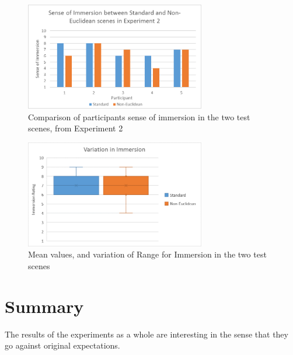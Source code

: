 			\begin{figure}[H]
				\includegraphics[width=0.7\textwidth]{Images/Compare_Immersion_Exp_2}
				\centering
				\caption{Comparison of participants sense of immersion in the two test scenes, from Experiment 2}
				\label{exp:fig:compare_immersion_exp2}
			\end{figure}

			\begin{figure}[H]
				\includegraphics[width=0.7\textwidth]{Images/Compare_Immersion_Variation}
				\centering
				\caption{Mean values, and variation of Range for Immersion in the two test scenes}
				\label{exp:fig:compare_immersion_variation}
			\end{figure}

	\section{Summary}
	\label{exp:summary}

		The results of the experiments as a whole are interesting in the sense that they go against original expectations.


